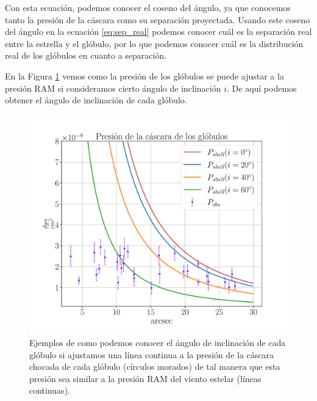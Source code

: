 \documentclass{book}
\begin{document}
Con esta ecuación, podemos conocer el coseno del ángulo, ya que conocemos tanto la presión de la cáscara como su separación proyectada. Usando este coseno del ángulo en la ecuación \ref{eq:sep_real} podemos conocer cuál es la separación real entre la estrella y el glóbulo, por lo que podemos conocer cuál es la distribución real de los glóbulos en cuanto a separación.  

En la Figura \ref{graf_presion_ang} vemos como la presión de los glóbulos se puede ajustar a la presión RAM si consideramos cierto ángulo de inclinación $i$. De aquí podemos obtener el ángulo de inclinación de cada glóbulo.%

\begin{figure}[htb]
    \centering
    \includegraphics[width=\textwidth]{ultimos/R_1_.pdf}
    \caption{Ejemplos de como podemos conocer el ángulo de inclinación de cada glóbulo si ajustamos una línea continua a la presión de la cáscara chocada de cada glóbulo (círculos morados) de tal manera que esta presión sea similar a la presión RAM del viento estelar (líneas continuas).}
    \label{graf_presion_ang}
\end{figure}
\end{document}
